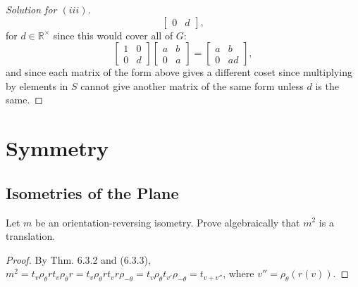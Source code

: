 \documentclass[12pt]{article}
\theoremstyle{remark}
\begin{document}
\begin{proof}[Solution for $(iii)$]
\begin{equation*}
\begin{bmatrix}
      0 & d
    \end{bmatrix},
  \end{equation*}
  for $d \in \mathbb{R}^\times$ since this would cover all of $G$:
  \begin{equation*}
    \begin{bmatrix}
      1 & 0\\
      0 & d
    \end{bmatrix}
    \begin{bmatrix}
      a & b\\
      0 & a
    \end{bmatrix}
    =
    \begin{bmatrix}
      a & b\\
      0 & ad
    \end{bmatrix},
  \end{equation*}
  and since each matrix of the form above gives a different coset since multiplying by elements in $S$ cannot give another matrix of the same form unless $d$ is the same.
\end{proof}

\setcounter{section}{5}
\section{Symmetry}
\setcounter{subsection}{2}
\subsection{Isometries of the Plane}
\setcounter{subsubsection}{1}
\begin{problem}
  Let $m$ be an orientation-reversing isometry. Prove algebraically that $m^2$ is a translation.
\end{problem}
\begin{proof}
  By Thm. 6.3.2 and (6.3.3), $m^2 = t_v\rho_\theta rt_v\rho_\theta r = t_v\rho_\theta r t_v r \rho_{-\theta} = t_v\rho_\theta t_{v'} \rho_{-\theta} = t_{v+v''}$, where $v'' = \rho_{\theta}(r(v))$.
\end{proof}
\end{document}
